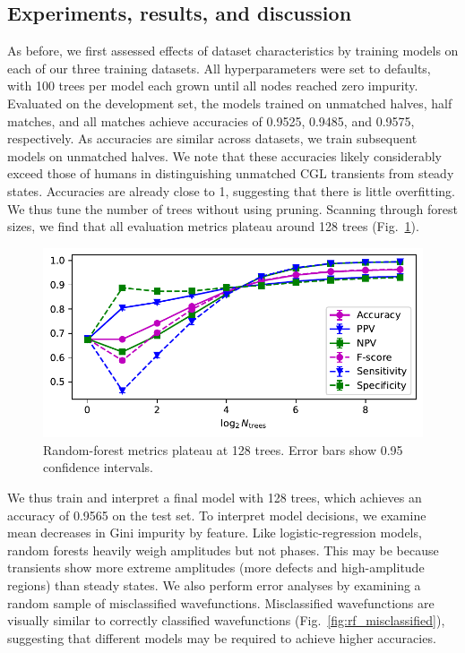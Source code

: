 \documentclass[nofootinbib,pre,superscriptaddress,twocolumn,longbibliography,floatfix]{revtex4-2}
\begin{document}
\subsection{Experiments, results, and discussion}
As before, we first assessed effects of dataset characteristics by training models on each of our three training datasets.
All hyperparameters were set to defaults, with 100 trees per model each grown until all nodes reached zero impurity.
Evaluated on the development set, the models trained on unmatched halves, half matches,
and all matches achieve accuracies of 0.9525, 0.9485, and 0.9575, respectively.
As accuracies are similar across datasets, we train subsequent models on unmatched halves.
We note that these accuracies likely considerably exceed those of humans in distinguishing unmatched CGL transients from steady states.
Accuracies are already close to 1, suggesting that there is little overfitting.
We thus tune the number of trees without using pruning.
Scanning through forest sizes, we find that all evaluation metrics plateau around 128 trees (Fig.~\ref{fig:rf_metrics}).

\begin{figure}[h]
    \centering
    \includegraphics[width=1.0\linewidth]{../figures/random_forest_metrics.pdf}
    \caption{Random-forest metrics plateau at 128 trees.
    Error bars show 0.95 confidence intervals.}
    \label{fig:rf_metrics}
\end{figure}

We thus train and interpret a final model with 128 trees,
which achieves an accuracy of 0.9565 on the test set.
To interpret model decisions, we examine mean decreases in Gini impurity by feature.
Like logistic-regression models, random forests heavily weigh amplitudes but not phases.
This may be because transients show more extreme amplitudes (more defects and high-amplitude regions) than steady states.
We also perform error analyses by examining a random sample of misclassified wavefunctions.
Misclassified wavefunctions are visually similar to correctly classified wavefunctions (Fig.~\ref{fig:rf_misclassified}),
suggesting that different models may be required to achieve higher accuracies.
\end{document}

